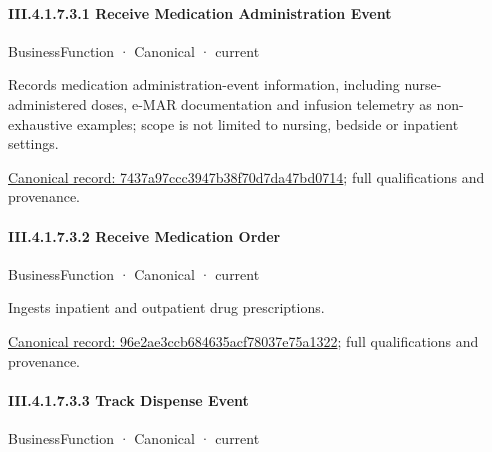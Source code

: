 \paragraph*{III.4.1.7.3.1 Receive Medication Administration Event}
\label{navigation:III.4.1.7.3.1}

\label{element:7437a97ccc3947b38f70d7da47bd0714}
{\small BusinessFunction · Canonical · current}\par

Records medication administration-event information, including nurse-administered doses, e-MAR documentation and infusion telemetry as non-exhaustive examples; scope is not limited to nursing, bedside or inpatient settings.


{\footnotesize \href{../../../../continuum/business/business-function/7437a97ccc3947b38f70d7da47bd0714.md}{Canonical record: 7437a97ccc3947b38f70d7da47bd0714}; full qualifications and provenance.}\par
\paragraph*{III.4.1.7.3.2 Receive Medication Order}
\label{navigation:III.4.1.7.3.2}

\label{element:96e2ae3ccb684635acf78037e75a1322}
{\small BusinessFunction · Canonical · current}\par

Ingests inpatient and outpatient drug prescriptions.


{\footnotesize \href{../../../../continuum/business/business-function/96e2ae3ccb684635acf78037e75a1322.md}{Canonical record: 96e2ae3ccb684635acf78037e75a1322}; full qualifications and provenance.}\par
\paragraph*{III.4.1.7.3.3 Track Dispense Event}
\label{navigation:III.4.1.7.3.3}

\label{element:e4c3b7e257b3448aa79d66992e9e9bbc}
{\small BusinessFunction · Canonical · current}\par

